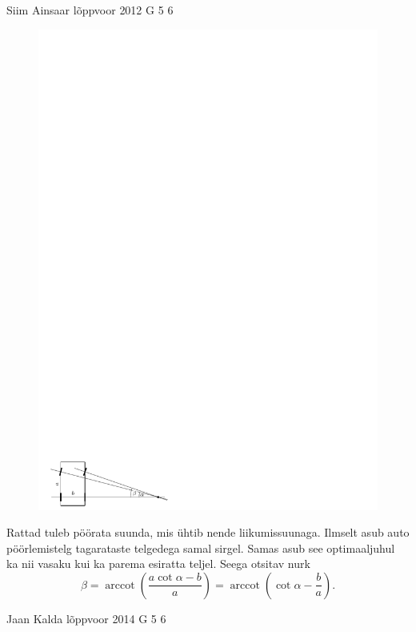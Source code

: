 \documentclass[11pt]{article}
\begin{document}
{%
{Siim Ainsaar} %
{lõppvoor} %
{2012} %
{G 5} %
{6} %
{

\ifSolution
\begin{figure}
\includegraphics[width=\linewidth]{2012-v3g-05-r_joonis}
\end{figure}
Rattad tuleb pöörata suunda, mis ühtib nende liikumissuunaga. Ilmselt asub auto
pöörlemistelg tagarataste telgedega samal sirgel. Samas asub see optimaaljuhul
ka nii vasaku kui ka parema esiratta teljel. Seega otsitav nurk
\[
\beta =
\operatorname{arccot} \left( \frac{a \cot\alpha - b}{a} \right)
=
\operatorname{arccot} \left( \cot\alpha - \frac ba \right).
\]
\fi
}

{Jaan Kalda} %
{lõppvoor} %
{2014} %
{G 5} %
{6} %
{

}}
\end{document}
